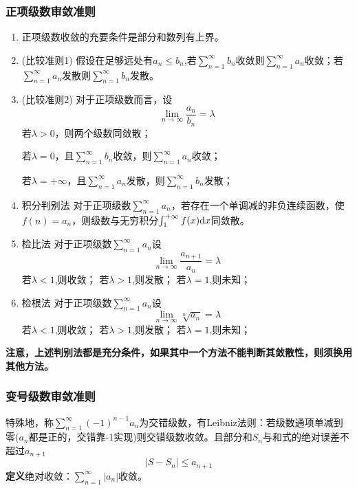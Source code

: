 \subsubsection{正项级数审敛准则}
\begin{enumerate}
	\item 正项级数收敛的充要条件是部分和数列有上界。
	\item (比较准则1) 假设在足够远处有$ a_n\leq b_n $,若$\sum\limits_{n=1}^{\infty }b_n$收敛则$\sum\limits_{n=1}^{\infty }a_n$收敛；若$\sum\limits_{n=1}^{\infty }a_n$发散则$\sum\limits_{n=1}^{\infty }b_n$发散。
	\item (比较准则2) 对于正项级数而言，设
	\begin{equation}\label{key}
		\lim\limits_{n\to \infty}\dfrac{a_n}{b_n}=\lambda
	\end{equation}
	若$\lambda>0$，则两个级数同敛散；
	
	若$\lambda=0$，且$\sum\limits_{n=1}^{\infty }b_n$收敛，则$\sum\limits_{n=1}^{\infty }a_n$收敛；
	
	若$\lambda=+\infty$，且$\sum\limits_{n=1}^{\infty }a_n$发散，则$\sum\limits_{n=1}^{\infty }b_n$发散；
	
	\item 积分判别法 对于正项级数$\sum\limits_{n=1}^{\infty }a_n$，若存在一个单调减的非负连续函数，使$ f(n)=a_n $，则级数与无穷积分$ \int_{1}^{+\infty}f(x)\mathrm{d} x $同敛散。
	\item 检比法 对于正项级数$\sum\limits_{n=1}^{\infty }a_n$设
	\begin{equation}\label{key}
		\lim_{n \rightarrow \infty} \dfrac{a_{n+1}}{a_n}=\lambda
	\end{equation}
	若$\lambda<1$,则收敛；
	若$\lambda>1$,则发散；
	若$\lambda=1$,则未知；
	\item 检根法 对于正项级数$\sum\limits_{n=1}^{\infty }a_n$设
	\begin{equation}\label{key}
		\lim_{n \rightarrow \infty}\sqrt[n]{a_n}=\lambda
	\end{equation}
	若$\lambda<1$,则收敛；
	若$\lambda>1$,则发散；
	若$\lambda=1$,则未知；
\end{enumerate}
\textbf{注意，上述判别法都是充分条件，如果其中一个方法不能判断其敛散性，则须换用其他方法。}

\subsubsection{变号级数审敛准则}
特殊地，称$ \sum_{n=1}^{\infty}(-1)^{n-1}a_n $为交错级数，有Leibniz法则：若级数通项单减到零($ a_n $都是正的，交错靠-1实现)则交错级数收敛。且部分和$S_n$与和式的绝对误差不超过$a_{n+1}$
\begin{equation}\label{key}
	|S-S_n|\leq a_{n+1}
\end{equation}
\textbf{定义}\quad 绝对收敛：$ \sum_{n=1}^{\infty}|a_n| $收敛。

